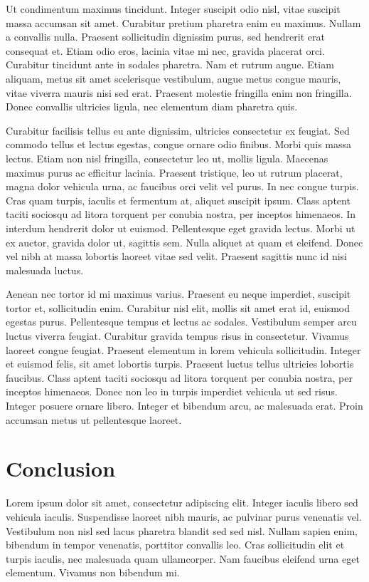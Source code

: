 \documentclass[12pt, english]{article}
\let\stdsection\section
\renewcommand\section{\newpage\stdsection}
\begin{document}
Ut condimentum maximus tincidunt. Integer suscipit odio nisl, vitae suscipit massa accumsan sit amet. Curabitur pretium pharetra enim eu maximus. Nullam a convallis nulla. Praesent sollicitudin dignissim purus, sed hendrerit erat consequat et. Etiam odio eros, lacinia vitae mi nec, gravida placerat orci. Curabitur tincidunt ante in sodales pharetra. Nam et rutrum augue. Etiam aliquam, metus sit amet scelerisque vestibulum, augue metus congue mauris, vitae viverra mauris nisi sed erat. Praesent molestie fringilla enim non fringilla. Donec convallis ultricies ligula, nec elementum diam pharetra quis.

Curabitur facilisis tellus eu ante dignissim, ultricies consectetur ex feugiat. Sed commodo tellus et lectus egestas, congue ornare odio finibus. Morbi quis massa lectus. Etiam non nisl fringilla, consectetur leo ut, mollis ligula. Maecenas maximus purus ac efficitur lacinia. Praesent tristique, leo ut rutrum placerat, magna dolor vehicula urna, ac faucibus orci velit vel purus. In nec congue turpis. Cras quam turpis, iaculis et fermentum at, aliquet suscipit ipsum. Class aptent taciti sociosqu ad litora torquent per conubia nostra, per inceptos himenaeos. In interdum hendrerit dolor ut euismod. Pellentesque eget gravida lectus. Morbi ut ex auctor, gravida dolor ut, sagittis sem. Nulla aliquet at quam et eleifend. Donec vel nibh at massa lobortis laoreet vitae sed velit. Praesent sagittis nunc id nisi malesuada luctus.

Aenean nec tortor id mi maximus varius. Praesent eu neque imperdiet, suscipit tortor et, sollicitudin enim. Curabitur nisl elit, mollis sit amet erat id, euismod egestas purus. Pellentesque tempus et lectus ac sodales. Vestibulum semper arcu luctus viverra feugiat. Curabitur gravida tempus risus in consectetur. Vivamus laoreet congue feugiat. Praesent elementum in lorem vehicula sollicitudin. Integer et euismod felis, sit amet lobortis turpis. Praesent luctus tellus ultricies lobortis faucibus. Class aptent taciti sociosqu ad litora torquent per conubia nostra, per inceptos himenaeos. Donec non leo in turpis imperdiet vehicula ut sed risus. Integer posuere ornare libero. Integer et bibendum arcu, ac malesuada erat. Proin accumsan metus ut pellentesque laoreet. 

\section{Conclusion}

Lorem ipsum dolor sit amet, consectetur adipiscing elit. Integer iaculis libero sed vehicula iaculis. Suspendisse laoreet nibh mauris, ac pulvinar purus venenatis vel. Vestibulum non nisl sed lacus pharetra blandit sed sed nisl. Nullam sapien enim, bibendum in tempor venenatis, porttitor convallis leo. Cras sollicitudin elit et turpis iaculis, nec malesuada quam ullamcorper. Nam faucibus eleifend urna eget elementum. Vivamus non bibendum mi.
\end{document}
